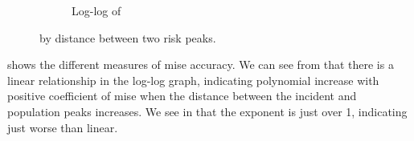 \begin{figure}[htbp]
\begin{subfigure}[b]{0.49\textwidth}
        \caption{Log-log of }
        \label{fig:ise:p1.4_100_Gap_risk:nmise_log_log}
    \end{subfigure}    
    \caption[ by distance between two risk peaks]
        { by distance between two risk peaks. \errorplotcaption}
    \label{fig:ise:p1.4_100_Gap_risk}
\end{figure}



 shows the different measures of \gls{mise} accuracy.
We can see from  that there is a linear relationship in the log-log graph,
indicating polynomial increase with positive coefficient of \gls{mise} when the distance between the incident and population peaks increases.
We see in  that the exponent is just over 1,
indicating just worse than linear.
